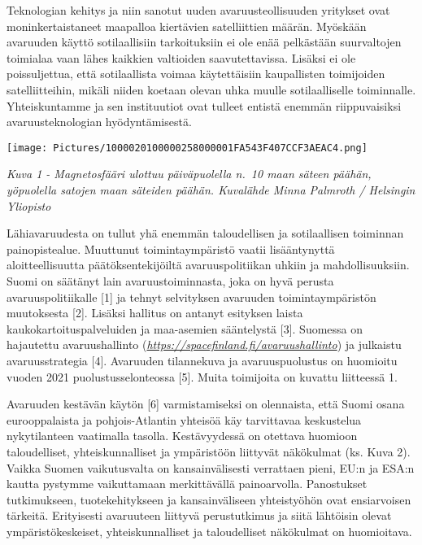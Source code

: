 Teknologian kehitys ja niin sanotut uuden avaruusteollisuuden yritykset
ovat moninkertaistaneet maapalloa kiertävien satelliittien määrän.
Myöskään avaruuden käyttö sotilaallisiin tarkoituksiin ei ole enää
pelkästään suurvaltojen toimialaa vaan lähes kaikkien valtioiden
saavutettavissa. Lisäksi ei ole poissuljettua, että sotilaallista voimaa
käytettäisiin kaupallisten toimijoiden satelliitteihin, mikäli niiden
koetaan olevan uhka muulle sotilaalliselle toiminnalle. Yhteiskuntamme
ja sen instituutiot ovat tulleet entistä enemmän riippuvaisiksi
avaruusteknologian hyödyntämisestä.

\texttt{[image: Pictures/1000020100000258000001FA543F407CCF3AEAC4.png]}

\protect\hypertarget{anchor-2}{}{}\emph{Kuva 1 - Magnetosfääri ulottuu
päiväpuolella n.~10 maan säteen päähän, yöpuolella satojen maan säteiden
päähän. Kuvalähde Minna Palmroth / Helsingin Yliopisto}

Lähiavaruudesta on tullut yhä enemmän taloudellisen ja sotilaallisen
toiminnan painopistealue. Muuttunut toimintaympäristö vaatii
lisääntynyttä aloitteellisuutta päätöksentekijöiltä avaruuspolitiikan
uhkiin ja mahdollisuuksiin. Suomi on säätänyt lain avaruustoiminnasta,
joka on hyvä perusta avaruuspolitiikalle {[}1{]} ja tehnyt selvityksen
avaruuden toimintaympäristön muutoksesta {[}2{]}. Lisäksi hallitus on
antanyt esityksen laista kaukokartoituspalveluiden ja maa-asemien
sääntelystä {[}3{]}. Suomessa on hajautettu avaruushallinto
(\href{https://spacefinland.fi/avaruushallinto}{\emph{https://spacefinland.fi/avaruushallinto}})
ja julkaistu avaruusstrategia {[}4{]}. Avaruuden tilannekuva ja
avaruuspuolustus on huomioitu vuoden 2021 puolustusselonteossa {[}5{]}.
Muita toimijoita on kuvattu liitteessä 1.

Avaruuden kestävän käytön {[}6{]} varmistamiseksi on olennaista, että
Suomi osana eurooppalaista ja pohjois-Atlantin yhteisöä käy tarvittavaa
keskustelua nykytilanteen vaatimalla tasolla. Kestävyydessä on otettava
huomioon taloudelliset, yhteiskunnalliset ja ympäristöön liittyvät
näkökulmat (ks. Kuva 2). Vaikka Suomen vaikutusvalta on kansainvälisesti
verrattaen pieni, EU:n ja ESA:n kautta pystymme vaikuttamaan
merkittävällä painoarvolla. Panostukset tutkimukseen, tuotekehitykseen
ja kansainväliseen yhteistyöhön ovat ensiarvoisen tärkeitä. Erityisesti
avaruuteen liittyvä perustutkimus ja siitä lähtöisin olevat
ympäristökeskeiset, yhteiskunnalliset ja taloudelliset näkökulmat on
huomioitava.

